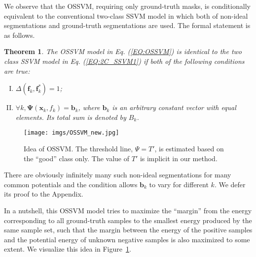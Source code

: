 \documentclass[10pt,journal,compsoc]{newIEEEtran}
\newtheorem{theorem}{Theorem}[section]
\begin{document}
We observe that the OSSVM, requiring only ground-truth masks, is conditionally equivalent to the conventional two-class SSVM model in which both of non-ideal segmentations and ground-truth segmentations are used. The formal statement is as follows.
\begin{theorem}\label{THM:2COEQ}
The OSSVM model in Eq. (\ref{EQ:OSSVM}) is identical to the two class SSVM model in Eq. (\ref{EQ:2C_SSVM1}) if both of the following conditions are true:
\begin{enumerate}[(I)]
	\item $\Delta(\mathbf{f}_k,\mathbf{f}^*_k)=1$;
	\item $\forall k, \mathbf{\Psi}(\mathbf{x}_k,f_k)=\mathbf{b}_k$, where $\mathbf{b}_k$ is an arbitrary constant vector with equal elements. Its total sum is denoted by ${B}_k$.
\end{enumerate}
\end{theorem}\begin{figure}[!t]
	\centering
	\texttt{[image: imgs/OSSVM\_new.jpg]}
	\caption{Idea of OSSVM. The threshold line, $\Psi=T'$, is estimated based on the ``good'' class only. The value of $T'$ is implicit in our method.}\label{fig:OSSVM}
\end{figure}

There are obviously infinitely many such non-ideal segmentations for many common potentials and the condition allows $\mathbf{b}_k$ to vary for different $k$. We defer its proof to the Appendix.

In a nutshell, this OSSVM model tries to maximize the ``margin'' from the energy corresponding to all ground-truth samples to the smallest energy produced by the same sample set, such that the margin between the energy of the positive samples and the potential energy of unknown negative samples is also maximized to some extent. We visualize this idea in Figure~\ref{fig:OSSVM}.
\end{document}
